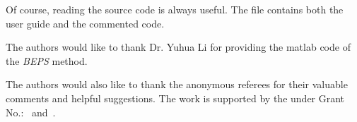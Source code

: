 Of course, reading the source code is always useful.  The file
 contains both the user guide and the commented
code.

\begin{acks}
  The authors would like to thank Dr. Yuhua Li for providing the
  matlab code of  the \textit{BEPS} method. 

  The authors would also like to thank the anonymous referees for
  their valuable comments and helpful suggestions. The work is
  supported by the  under Grant
  No.:~
  and~.

\end{acks}
